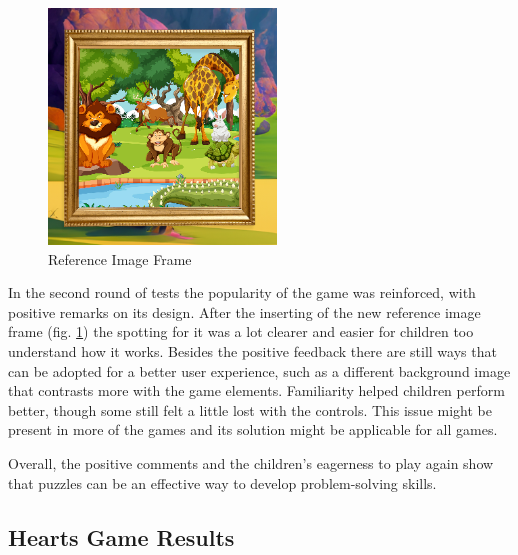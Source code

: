 \begin{figure}[!h]
    \centering
    \includegraphics[width=0.5\linewidth]{Chapters/game_changes/puzzle-game-frame.png}
    \caption{Reference Image Frame}
    \label{fig:puzzleRefImage}
\end{figure}

In the second round of tests the popularity of the game was reinforced, with positive remarks on its design. After the inserting of the new reference image frame (fig. \ref{fig:puzzleRefImage}) the spotting for it was a lot clearer and easier for children too understand how it works. Besides the positive feedback there are still ways that can be adopted for a better user experience, such as a different background image that contrasts more with the game elements.
Familiarity helped children perform better, though some still felt a little lost with the controls. This issue might be present in more of the games and its solution might be applicable for all games.

Overall, the positive comments and the children’s eagerness to play again show that puzzles can be an effective way to develop problem-solving skills.


\newpage
\subsection{Hearts Game Results}


